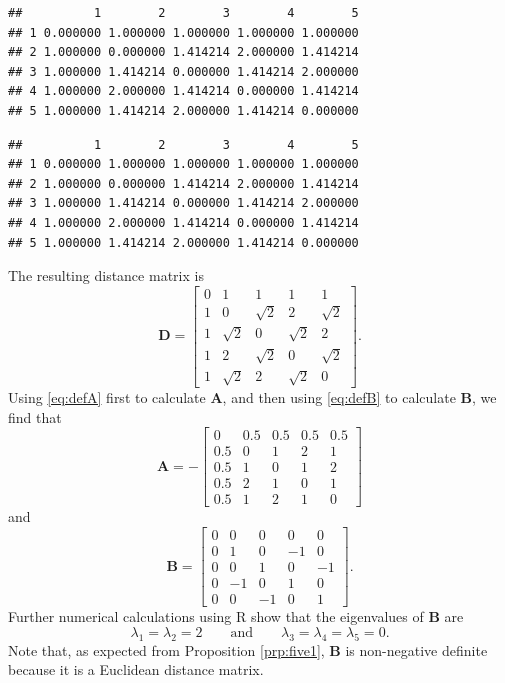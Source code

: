 \documentclass[]{book}
\newenvironment{Shaded}{\begin{snugshade}}{\end{snugshade}}
\newcommand{\DataTypeTok}[1]{\textcolor[rgb]{0.13,0.29,0.53}{#1}}
\newcommand{\KeywordTok}[1]{\textcolor[rgb]{0.13,0.29,0.53}{\textbf{#1}}}
\newcommand{\NormalTok}[1]{#1}
\newcommand{\OperatorTok}[1]{\textcolor[rgb]{0.81,0.36,0.00}{\textbf{#1}}}
\newcommand{\OtherTok}[1]{\textcolor[rgb]{0.56,0.35,0.01}{#1}}
\newcommand{\StringTok}[1]{\textcolor[rgb]{0.31,0.60,0.02}{#1}}
\theoremstyle{definition}
\theoremstyle{definition}
\theoremstyle{definition}
\theoremstyle{remark}
\begin{document}
\begin{verbatim}
##          1        2        3        4        5
## 1 0.000000 1.000000 1.000000 1.000000 1.000000
## 2 1.000000 0.000000 1.414214 2.000000 1.414214
## 3 1.000000 1.414214 0.000000 1.414214 2.000000
## 4 1.000000 2.000000 1.414214 0.000000 1.414214
## 5 1.000000 1.414214 2.000000 1.414214 0.000000
\end{verbatim}

\begin{Shaded}
\end{Shaded}

\begin{verbatim}
##          1        2        3        4        5
## 1 0.000000 1.000000 1.000000 1.000000 1.000000
## 2 1.000000 0.000000 1.414214 2.000000 1.414214
## 3 1.000000 1.414214 0.000000 1.414214 2.000000
## 4 1.000000 2.000000 1.414214 0.000000 1.414214
## 5 1.000000 1.414214 2.000000 1.414214 0.000000
\end{verbatim}

The resulting distance matrix is
\[
\boldsymbol D=\left [ \begin{array}{ccccc}
0&1&1&1&1\\
1&0&\sqrt{2}&2&\sqrt{2}\\
1&\sqrt{2}&0&\sqrt{2}&2\\
1&2&\sqrt{2}&0&\sqrt{2}\\
1&\sqrt{2}&2&\sqrt{2}&0
\end{array} \right ].
\]
Using \eqref{eq:defA} first to calculate \(\boldsymbol A\), and then using \eqref{eq:defB} to calculate \(\boldsymbol B\), we find that
\[
\boldsymbol A=-\left [ \begin{array}{ccccc}
0&0.5&0.5&0.5&0.5\\
0.5&0&1&2&1\\
0.5&1&0&1&2\\
0.5&2&1&0&1\\
0.5&1&2&1&0
\end{array} \right ]
\]
and
\[
\boldsymbol B=\left [ \begin{array}{ccccc}
 0& 0&0&0&0\\
0&1&0&-1&0\\
0&0&1&0&-1\\
0&-1&0&1&0\\
0&0&-1&0&1
\end{array} \right ].
\]
Further numerical calculations using R show that the eigenvalues of \(\boldsymbol B\) are
\[
\lambda_1=\lambda_2=2 \qquad \text{and} \qquad \lambda_3=\lambda_4=\lambda_5=0.
\]
Note that, as expected from Proposition \ref{prp:five1}, \(\boldsymbol B\) is non-negative definite because it is a Euclidean
distance matrix.
\end{document}
